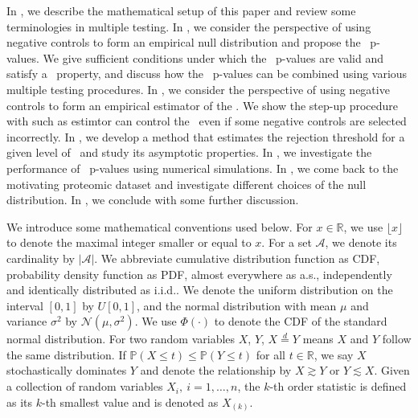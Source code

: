 \documentclass[a4paper,11pt]{article}
\theoremstyle{plain}
\theoremstyle{definition}
\def\PP{\mathbb{P}}
\def\RR{\mathbb{R}}
\def\calA{\mathcal{A}}
\def\calN{\mathcal{N}}
\theoremstyle{plain}
\newcommand{\nickname}{{\text{RANC}}}
\newcommand{\FDR}{\text{FDR}}
\newcommand{\localFDR}{\text{local-FDR}}
\newcommand{\PRDS}{{\text{PRDS}}}
\begin{document}
In , we describe the mathematical setup of
this paper and review some terminologies in multiple testing.
In , we consider the perspective of using negative
controls to form an empirical null distribution and propose the
\nickname~p-values. We give sufficient conditions under which the
\nickname~p-values are valid and satisfy a \PRDS~property, and discuss how the
\nickname~p-values can be combined using various multiple testing
procedures. In , we consider the
perspective of using negative controls to form an empirical estimator
of the \FDR. We show the step-up procedure with such as estimtor
can control the \FDR\ even if some negative controls are selected incorrectly.
In , we develop a method that estimates the
rejection threshold for a given level of \localFDR\ and study its
asymptotic properties. In , we investigate the
performance of \nickname~p-values using numerical simulations.
In , we come back to the motivating proteomic
dataset and investigate different choices of the null distribution. In
, we conclude with some further discussion.

We introduce some mathematical conventions used below.
For $x \in \RR$, we use $\lfloor x \rfloor$ to denote the maximal integer smaller or equal to $x$.
For a set $\calA$, we denote its cardinality by $|\calA|$.
We abbreviate cumulative distribution function as CDF,
probability density function as PDF,
almost everywhere as a.s.,
independently and identically distributed as i.i.d..
We denote the uniform distribution on the interval $[0,1]$ by $U[0,1]$, and the normal distribution with mean $\mu$ and variance $\sigma^2$ by $\calN(\mu, \sigma^2)$.
We use $\Phi(\cdot)$ to denote the CDF of the standard normal distribution.
For two random variables $X$, $Y$, $X \stackrel{d}{=} Y$ means $X$ and $Y$ follow the same distribution.
If $\PP(X \le t) \le \PP(Y \le t)$ for all $t \in \RR$, we say $X$
stochastically dominates $Y$ and denote the relationship by $X \gtrsim
Y$ or $Y \lesssim X$. Given a collection of random variables
$X_i,~i=1,\dotsc,n$, the $k$-th order statistic is defined as its $k$-th
smallest value and is denoted as $X_{(k)}$.
\end{document}
